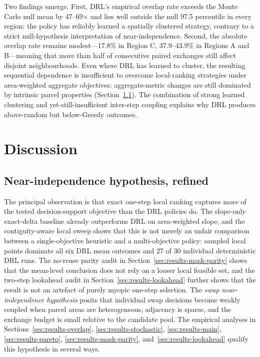\documentclass[]{interact}
\theoremstyle{plain}
\begin{document}
Two findings emerge. First, DRL's empirical overlap rate exceeds the Monte Carlo null mean by 47--69$\times$ and lies well outside the null 97.5 percentile in every region: the policy has reliably learned a spatially clustered strategy, contrary to a strict null-hypothesis interpretation of near-independence. Second, the absolute overlap rate remains modest---17.8\% in Region C, 37.9--43.9\% in Regions A and B---meaning that more than half of consecutive paired exchanges still affect disjoint neighbourhoods. Even where DRL has learned to cluster, the resulting sequential dependence is insufficient to overcome local-ranking strategies under area-weighted aggregate objectives: aggregate-metric changes are still dominated by intrinsic parcel properties (Section~\ref{sec:disc-near-indep}). The combination of strong learned clustering and yet-still-insufficient inter-step coupling explains why DRL produces above-random but below-Greedy outcomes.




\section{Discussion}\label{sec:disc}

\subsection{Near-independence hypothesis, refined}\label{sec:disc-near-indep}

The principal observation is that exact one-step local ranking captures more of the tested decision-support objective than the DRL policies do. The slope-only exact-delta baseline already outperforms DRL on area-weighted slope, and the contiguity-aware local sweep shows that this is not merely an unfair comparison between a single-objective heuristic and a multi-objective policy: sampled local points dominate all six DRL mean outcomes and 27 of 30 individual deterministic DRL runs. The no-reuse parity audit in Section~\ref{sec:results-mask-parity} shows that the mean-level conclusion does not rely on a looser local feasible set, and the two-step lookahead audit in Section~\ref{sec:results-lookahead} further shows that the result is not an artefact of purely myopic one-step selection. The \emph{swap near-independence hypothesis} posits that individual swap decisions become weakly coupled when parcel areas are heterogeneous, adjacency is sparse, and the exchange budget is small relative to the candidate pool. The empirical analyses in Sections~\ref{sec:results-overlap}, \ref{sec:results-stochastic}, \ref{sec:results-main}, \ref{sec:results-pareto}, \ref{sec:results-mask-parity}, and~\ref{sec:results-lookahead} qualify this hypothesis in several ways.
\end{document}
